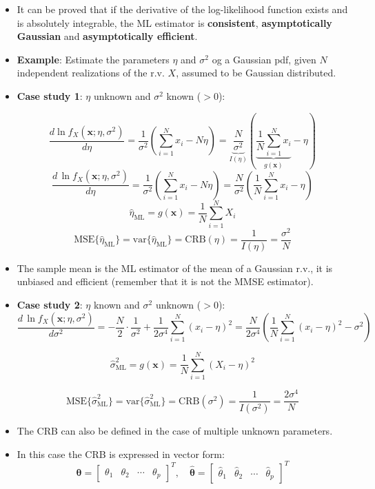 \begin{itemize}
    \[
\operatorname{MSE}\{\hat{\theta}(\mathbf{x})\}
=
\operatorname{MSE}\{g(\mathbf{x})\}
=
\operatorname{CRB}(\theta)
=
\frac{1}{I(\theta)}
\]
    \item It can be proved that if the derivative of the log-likelihood function exists and is absolutely integrable, the ML estimator is \textbf{consistent}, \textbf{asymptotically Gaussian} and \textbf{asymptotically efficient}.
    \item \textbf{Example}: Estimate the parameters \(\eta\) and \(\sigma^2\) og a Gaussian pdf, given \(N\) independent realizations of the r.v. \(X\), assumed to be Gaussian distributed.
    \item \textbf{Case study 1}: \(\eta\) unknown and \(\sigma^2\) known (\(>0\)):

    \[
    \frac{d \ln f_{X}(\mathbf{x};\eta,\sigma^{2})}{d\eta}
    = \frac{1}{\sigma^{2}}\!\left(\sum_{i=1}^{N} x_i - N\eta\right)
    = \underbrace{\frac{N}{\sigma^{2}}}_{I(\eta)}
    \left(\underbrace{\frac{1}{N}\sum_{i=1}^{N} x_i}_{g(\mathbf{x})}-\eta\right)
    \]
    $$
    \frac{d\,\ln f_{X}(\mathbf{x};\eta,\sigma^{2})}{d\eta}
    =\frac{1}{\sigma^{2}}\!\left(\sum_{i=1}^{N} x_{i}-N\eta\right)
    =\frac{N}{\sigma^{2}}\!\left(\frac{1}{N}\sum_{i=1}^{N} x_{i}-\eta\right)
    $$
    $$
    \hat{\eta}_{\text{ML}}=g(\mathbf{x})=\frac{1}{N}\sum_{i=1}^{N} X_{i}
    $$
    $$
    \mathrm{MSE}\{\hat{\eta}_{\text{ML}}\}
    =\mathrm{var}\{\hat{\eta}_{\text{ML}}\}
    =\mathrm{CRB}(\eta)
    =\frac{1}{I(\eta)}
    =\frac{\sigma^{2}}{N}
    $$
    \item The sample mean is the ML estimator of the mean of a Gaussian r.v., it is unbiased and efficient (remember that it is not the MMSE estimator).
    \item \textbf{Case study 2}: \(\eta\) known and \(\sigma^2\) unknown (\(>0\)):
    $$
    \frac{d\,\ln f_{X}(\mathbf{x};\eta,\sigma^{2})}{d\sigma^{2}}
    =-\frac{N}{2}\cdot\frac{1}{\sigma^{2}}+\frac{1}{2\sigma^{4}}\sum_{i=1}^{N}(x_{i}-\eta)^{2}
    =\frac{N}{2\sigma^{4}}\!\left(\frac{1}{N}\sum_{i=1}^{N}(x_{i}-\eta)^{2}-\sigma^{2}\right)
    $$


    $$
    \hat{\sigma}^{2}_{\mathrm{ML}}=g(\mathbf{x})=\frac{1}{N}\sum_{i=1}^{N}(X_{i}-\eta)^{2}
    $$


    $$
    \mathrm{MSE}\{\hat{\sigma}^{2}_{\mathrm{ML}}\}
    =\mathrm{var}\{\hat{\sigma}^{2}_{\mathrm{ML}}\}
    =\mathrm{CRB}(\sigma^{2})
    =\frac{1}{I(\sigma^{2})}
    =\frac{2\sigma^{4}}{N}
    $$
    \item The CRB can also be defined in the case of multiple unknown parameters.
    \item In this case the CRB is expressed in vector form:
    $$
\boldsymbol{\theta}=\begin{bmatrix}\theta_{1}&\theta_{2}&\cdots&\theta_{p}\end{bmatrix}^{T},\quad\hat{\boldsymbol{\theta}}=\begin{bmatrix}\hat{\theta}_{1}&\hat{\theta}_{2}&\cdots&\hat{    \theta}_{p}\end{bmatrix}^{T}
    $$



\end{itemize}
